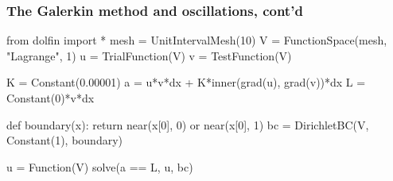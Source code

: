 \begin{frame}[fragile]
\frametitle{The Galerkin method and oscillations, cont'd}
\begin{python}
from dolfin import *
mesh = UnitIntervalMesh(10)
V = FunctionSpace(mesh, "Lagrange", 1) 
u = TrialFunction(V)
v = TestFunction(V)

K = Constant(0.00001)
a = u*v*dx + K*inner(grad(u), grad(v))*dx 
L = Constant(0)*v*dx 

def boundary(x): return near(x[0], 0) or near(x[0], 1) 
bc = DirichletBC(V, Constant(1), boundary)

u = Function(V)
solve(a == L, u, bc)
\end{python}
\end{frame}
